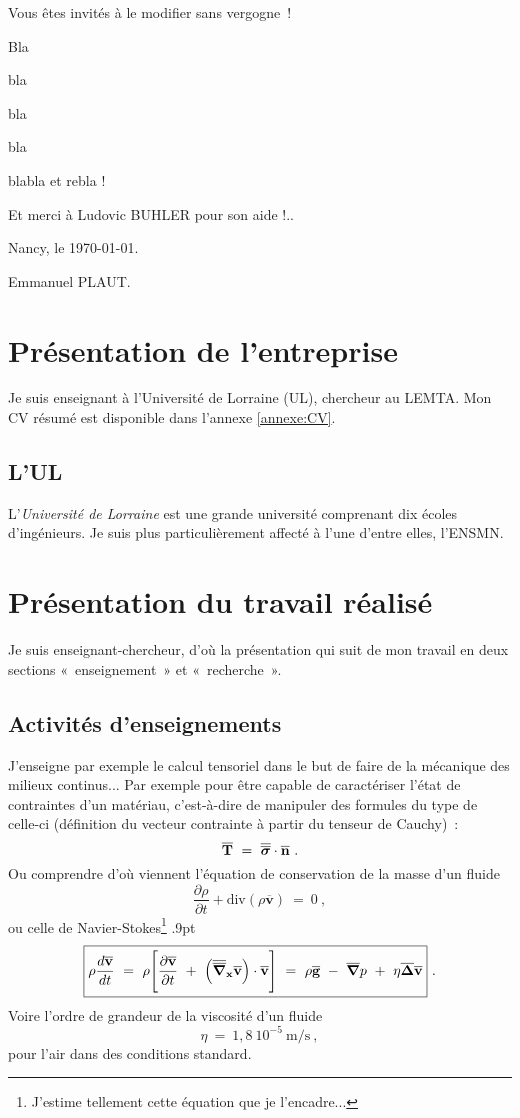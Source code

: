 \documentclass[12pt]{report}
\newcommand{\encadre}[1]{\fbox{$\displaystyle{#1}$}}
\newcommand{\m}{\textrm{m}}
\newcommand{\s}{\textrm{s}}
\newcommand{\D}{\partial}
\newcommand{\Div}{\textrm{div}}
\newcommand{\Delv}{\overline{\mbox{\boldmath{$\Delta$}}}}
\newcommand{\gv}{\overline{\textbf{g}}}
\newcommand{\nv}{\overline{\textbf{n}}}
\newcommand{\Tv}{\overline{\textbf{T}}}
\newcommand{\vv}{\overline{\textbf{v}}}
\newcommand{\nabv}{\overline{\mbox{\boldmath{$\nabla$}}}}
\newcommand{\sigt}{\overline{\overline{\mbox{\boldmath{$\sigma$}}}}}
\newcommand{\nabt}{\overline{\overline{\mbox{\boldmath{$\nabla$}}}}}
\begin{document}
Vous êtes invités à le modifier sans vergogne~!
\vskip12mm

Bla

bla

bla

bla
\vskip3mm

blabla et rebla !
\vskip3mm

Et merci à Ludovic BUHLER pour son aide !..

\begin{flushright}
Nancy, le \today.
\vskip3mm

Emmanuel PLAUT.
\end{flushright}

\chapter{Présentation de l'entreprise}
Je suis enseignant à l'Université de Lorraine (UL), chercheur au LEMTA.
Mon CV résumé est disponible dans l'annexe \ref{annexe:CV}.
\section{L'UL}
L'\emph{Université de Lorraine} est une grande université
comprenant dix écoles d'ingénieurs.
Je suis plus particulièrement affecté à l'une d'entre elles, l'ENSMN.


\chapter{Présentation du travail réalisé}
Je suis enseignant-chercheur, d'où la présentation
qui suit de mon travail en deux sections «~enseignement~» et «~recherche~».

\section{Activités d'enseignements}
J'enseigne par exemple le calcul tensoriel dans le but de faire de la mécanique
des milieux continus...
Par exemple pour être capable de caractériser l'état de contraintes
d'un matériau,
c'est-à-dire de manipuler des formules du type de celle-ci
(définition du vecteur contrainte à partir du tenseur de Cauchy)~:
$$\Tv~=~\sigt\cdot\nv~.
$$
Ou comprendre d'où viennent l'équation de conservation de la masse
d'un fluide
$$\frac{\D\rho}{\D t}+\Div(\rho\vv)~=~0~,
$$
ou celle de Navier-Stokes\footnote{
J'estime tellement cette équation que je l'encadre...}
\fboxrule.9pt
$$
  \encadre{\rho\frac{d\vv}{dt}~=~\rho\Bigg[\frac{\D\vv}{\D t}~+~
  \Big(\nabt_{\textbf{x}}\vv\Big)\cdot\vv\Bigg]~=~
  \rho\gv~-~\nabv p~+~\eta\Delv\vv}~.
$$
Voire l'ordre de grandeur de la viscosité d'un fluide
$$\eta~=~1,8~10^{-5}~\m/\s~,
$$
pour l'air dans des conditions standard.
\end{document}
